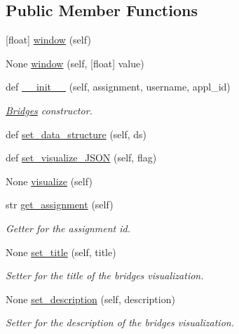 \subsection*{Public Member Functions}
\begin{DoxyCompactItemize}
\item 
\mbox{[}float\mbox{]} \mbox{\hyperlink{classbridges_1_1bridges_1_1_bridges_abe7d2ce9cd70820a94914b8b2964b215}{window}} (self)
\item 
None \mbox{\hyperlink{classbridges_1_1bridges_1_1_bridges_a0bec2e26f9b318f4eb89ed7281565771}{window}} (self, \mbox{[}float\mbox{]} value)
\item 
def \mbox{\hyperlink{classbridges_1_1bridges_1_1_bridges_af174072883f6f269a9fe7cc02e12c276}{\+\_\+\+\_\+init\+\_\+\+\_\+}} (self, assignment, username, appl\+\_\+id)
\begin{DoxyCompactList}\small\item\em \mbox{\hyperlink{classbridges_1_1bridges_1_1_bridges}{Bridges}} constructor. \end{DoxyCompactList}\item 
def \mbox{\hyperlink{classbridges_1_1bridges_1_1_bridges_a868f02fa66c87c1a1fc7bd6fbc799291}{set\+\_\+data\+\_\+structure}} (self, ds)
\item 
def \mbox{\hyperlink{classbridges_1_1bridges_1_1_bridges_ab50d018b5178ca33de24157b7b6de285}{set\+\_\+visualize\+\_\+\+J\+S\+ON}} (self, flag)
\item 
None \mbox{\hyperlink{classbridges_1_1bridges_1_1_bridges_a822a7338e4dce27f7d8d0d322bdace08}{visualize}} (self)
\item 
str \mbox{\hyperlink{classbridges_1_1bridges_1_1_bridges_ae74fd60689c1cb3088c80e6097d14e73}{get\+\_\+assignment}} (self)
\begin{DoxyCompactList}\small\item\em Getter for the assignment id. \end{DoxyCompactList}\item 
None \mbox{\hyperlink{classbridges_1_1bridges_1_1_bridges_a46ecfa60298f97bd7605f1e224cfab10}{set\+\_\+title}} (self, title)
\begin{DoxyCompactList}\small\item\em Setter for the title of the bridges visualization. \end{DoxyCompactList}\item 
None \mbox{\hyperlink{classbridges_1_1bridges_1_1_bridges_ac61a47f230c8f96f85d810498fad8b97}{set\+\_\+description}} (self, description)
\begin{DoxyCompactList}\small\item\em Setter for the description of the bridges visualization. \end{DoxyCompactList}\item 

\end{DoxyCompactItemize}
